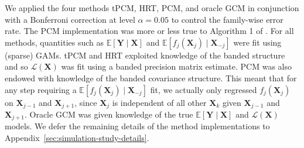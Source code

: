 \documentclass[12pt]{article}
\theoremstyle{definition}
\theoremstyle{remark}
\newcommand{\E}{\mathbb E}								%
\newcommand{\prx}{\bm X}								%
\newcommand{\pry}{{\bm Y}}								%
\newcommand{\law}{\mathcal L}							%
\newcommand{\minus}{\textnormal{-}} 						    %
\begin{document}
	We applied the four methods tPCM, HRT, PCM, and oracle GCM in conjunction with a Bonferroni correction at level $\alpha = 0.05$ to control the family-wise error rate. The PCM implementation was more or less true to Algorithm 1 of \citet{Lundborg2022a}. For all methods, quantities such as $\E[\pry \mid \prx]$ and $\E[f_j(\prx_j) \mid \prx_{-j}]$ were fit using (sparse) GAMs. tPCM and HRT exploited knowledge of the banded structure and so $\law(\prx)$ was fit using a banded precision matrix estimate. PCM was also endowed with knowledge of the banded covariance structure. This meant that for any step requiring a $\E[f_j(\prx_j) \mid \prx_{-j}]$ fit, we actually only regressed $f_j(\prx_j)$ on $\prx_{j-1}$ and $\prx_{j+1}$, since $\prx_j$ is independent of all other $\mathbf{X}_k$ given $\prx_{j-1}$ and $\prx_{j+1}$. Oracle GCM was given knowledge of the true $\E[\pry \mid \prx]$ and $\law(\prx)$ models. We defer the remaining details of the method implementations to Appendix~\ref{sec:simulation-study-details}. 
	
\end{document}
